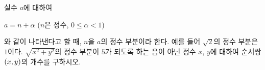실수 $a$에 대하여\par\noindent\hspace*{1.5em}$a=n+\alpha$ ($n$은 정수, $0\le\alpha<1$)\par\noindent 와 같이 나타낸다고 할 때, $n$을 $a$의 정수 부분이라 한다. 예를 들어 $\sqrt{2}$의 정수 부분은 $1$이다. $\sqrt{x^2+y^2}$의 정수 부분이 $5$가 되도록 하는 음이 아닌 정수 $x$, $y$에 대하여 순서쌍 $(x{,}\mkern3mu y)$의 개수를 구하시오.
